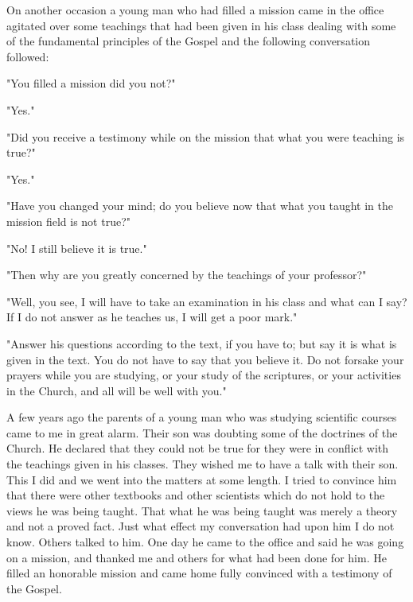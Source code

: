 On another occasion a young man who had filled a mission came in the office agitated over
some teachings that had been given in his class dealing with some of the fundamental
principles of the Gospel and the following conversation followed:

"You filled a mission did you not?"

"Yes."

"Did you receive a testimony while on the mission that what you were teaching is true?"

"Yes."

"Have you changed your mind; do you believe now that what you taught in the mission field
is not true?"

"No! I still believe it is true."

"Then why are you greatly concerned by the teachings of your professor?"

"Well, you see, I will have to take an examination in his class and what can I say? If I do not
answer as he teaches us, I will get a poor mark."

"Answer his questions according to the text, if you have to; but say it is what is given in the
text. You do not have to say that you believe it. Do not forsake your prayers while you are
studying, or your study of the scriptures, or your activities in the Church, and all will be well
with you."

A few years ago the parents of a young man who was studying scientific courses came to me
in great alarm. Their son was doubting some of the doctrines of the Church. He declared that
they could not be true for they were in conflict with the teachings given in his classes. They
wished me to have a talk with their son. This I did and we went into the matters at some
length. I tried to convince him that there were other textbooks and other scientists which do
not hold to the views he was being taught. That what he was being taught was merely a
theory and not a proved fact. Just what effect my conversation had upon him I do not know.
Others talked to him. One day he came to the office and said he was going on a mission, and
thanked me and others for what had been done for him. He filled an honorable mission and
came home fully convinced with a testimony of the Gospel.

